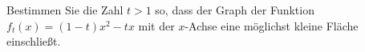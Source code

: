 \begin{ExerciseBlock}
Bestimmen Sie die Zahl $t>1$ so, dass der Graph der Funktion $f_t(x) = (1-t) x^2 - tx$ mit der $x$-Achse eine möglichst kleine Fläche einschließt.

\end{ExerciseBlock}
